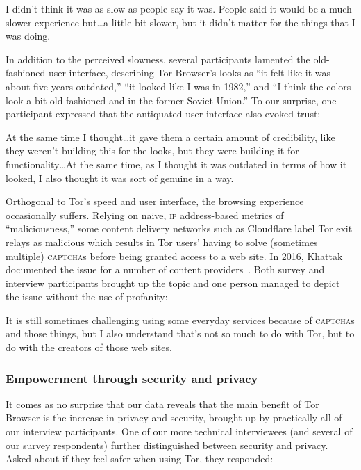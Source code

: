 \begin{displayquote}[P03]
I didn't think it was as slow as people say it was. People said it would be a
much slower experience but\ldots a little bit slower, but it didn't matter for
the things that I was doing.
\end{displayquote}

In addition to the perceived slowness, several participants lamented the
old-fashioned user interface, describing Tor Browser's looks as ``it felt like
it was about five years outdated,'' ``it looked like I was in 1982,'' and ``I
think the colors look a bit old fashioned and in the former Soviet Union.'' To
our surprise, one participant expressed that the antiquated user interface also
evoked trust:

\begin{displayquote}[P02]
At the same time I thought\ldots it gave them a certain amount of credibility,
like they weren't building this for the looks, but they were building it for
functionality\ldots  At the same time, as I thought it was outdated in terms of
how it looked, I also thought it was sort of genuine in a way.
\end{displayquote}

Orthogonal to Tor's speed and user interface, the browsing experience
occasionally suffers.  Relying on naive, \textsc{ip} address-based metrics of
``maliciousness,'' some content delivery networks such as Cloudflare label Tor
exit relays as malicious which results in Tor users' having to solve (sometimes
multiple) \textsc{captcha}s before being granted access to a web site.  In 2016,
Khattak \ea documented the issue for a number of content
providers~\cite{Khattak2016a}.  Both survey and interview participants brought
up the topic and one person managed to depict the issue without the use of
profanity:

\begin{displayquote}[P06]
It is still sometimes challenging using some everyday services because of
\textsc{captcha}s and those things, but I also understand that's not so much to
do with Tor, but to do with the creators of those web sites.
\end{displayquote}

\subsubsection{Empowerment through security and privacy}

It comes as no surprise that our data reveals that the main benefit of Tor
Browser is the increase in privacy and security, brought up by practically all
of our interview participants.  One of our more technical interviewees (and
several of our survey respondents) further distinguished between security and
privacy.  Asked about if they feel safer when using Tor, they responded:

